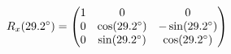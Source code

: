 \documentclass[preview]{standalone}
\begin{document}
\begin{align*}
\special{dvisvgm:raw <g id='unique000'>}R_x(29.2^\circ) = \begin{pmatrix} 1 & 0 & 0 \\ 0 & \cos(29.2^\circ) & -\sin(29.2^\circ) \\ 0 & \sin(29.2^\circ) & \cos(29.2^\circ) \end{pmatrix}\special{dvisvgm:raw </g>}
\end{align*}
\end{document}

